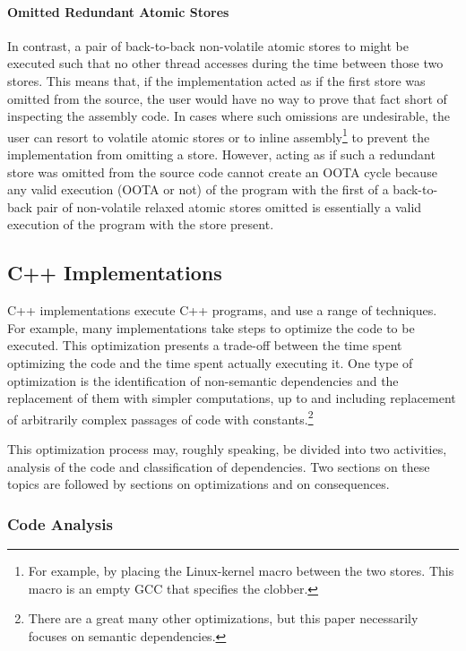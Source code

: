 \documentclass[10]{article}
\begin{document}
\paragraph{Omitted Redundant Atomic Stores}
In contrast, a pair of back-to-back non-volatile atomic stores to 
might be executed such that no other thread accesses 
during the time between those two stores.
This means that, if the implementation acted as if the first store was omitted
from the source, the user would have no way to prove that fact short of
inspecting the assembly code.
In cases where such omissions are undesirable, the user can resort to
volatile atomic stores or to inline assembly\footnote{
	For example, by placing the Linux-kernel  macro
	between the two stores.
	This macro is an empty GCC  that specifies the 
	clobber.}
to prevent the implementation from omitting a store.
However, acting as if such a redundant store was omitted from the source
code cannot create an OOTA cycle because any valid execution (OOTA or not)
of the program with the first of a back-to-back pair of non-volatile
relaxed atomic stores omitted is essentially a valid execution of the
program with the store present.

\subsection{C++ Implementations}
\label{sec:C++ Implementations}

C++ implementations execute C++ programs, and use a range of techniques.
For example, many implementations take steps to optimize the code to
be executed.
This optimization presents a trade-off between the time spent optimizing
the code and the time spent actually executing it.
One type of optimization is the identification of non-semantic dependencies
and the replacement of them with simpler computations, up to and including
replacement of arbitrarily complex passages of code with constants.\footnote{
	There are a great many other optimizations, but this paper
	necessarily focuses on semantic dependencies.}

This optimization process may, roughly speaking, be divided into two
activities, analysis of the code and classification of dependencies.
Two sections on these topics are followed by sections on optimizations
and on consequences.

\subsubsection{Code Analysis}
\label{sec:Code Analysis}
\end{document}
